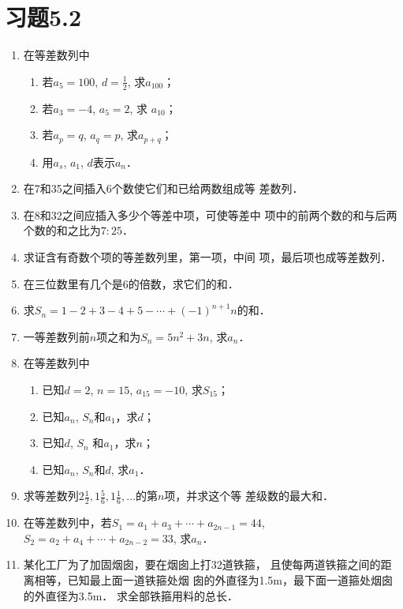 \section*{习题5.2}
\begin{enumerate}
    \item 在等差数列中
\begin{multicols}{2}
\begin{enumerate}
    \item 若$a_5=100$, $d=\frac{1}{2}$,
    求$a_{100}$；
    \item 若$a_3=-4$, $a_5=2$, 求
    $a_{10}$；
    \item 若$a_p=q$, $a_q=p$, 求$a_{p+q}$；
    \item 用$a_s$, $a_1$, $d$表示$a_n$．
\end{enumerate}
\end{multicols}

\item 在7和35之间插入6个数使它们和已给两数组成等
差数列．
\item 在8和32之间应插入多少个等差中项，可使等差中
项中的前两个数的和与后两个数的和之比为$7:25$．
\item 求证含有奇数个项的等差数列里，第一项，中间
项，最后项也成等差数列．
\item 在三位数里有几个是6的倍数，求它们的和．
\item 求$S_n=1-2+3-4+5-\cdots+(-1)^{n+1}n$的和．
\item 一等差数列前$n$项之和为$S_n=5n^2+3n$, 求$a_n$．
\item 在等差数列中
\begin{enumerate}
    \item 已知$d=2$, $n=15$, $a_{15}=-10$, 求$S_{15}$；
    \item 已知$a_n$, $S_n$和$a_1$，求$d$；
    \item 已知$d$, $S_n$ 和$a_1$，求$n$；
    \item 已知$a_n$, $S_n$和$d$, 求$a_1$．
\end{enumerate}

\item 求等差数列$2\frac{1}{2},1\frac{5}{6},1\frac{1}{6},\ldots$的第$n$项，并求这个等
差级数的最大和．
\item 在等差数列中，若$S_1=a_1+a_3+\cdots+a_{2n-1}=44$,
$S_2=a_2+a_4+\cdots+a_{2n-2}=33$, 求$a_n$．
\item 某化工厂为了加固烟囱，要在烟囱上打32道铁箍，
且使每两道铁箍之间的距离相等，已知最上面一道铁箍处烟
囱的外直径为1.5m，最下面一道箍处烟囱的外直径为3.5m．
求全部铁箍用料的总长．


\end{enumerate}
